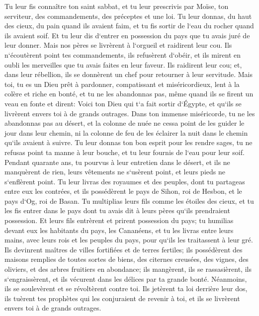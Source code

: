 \verse Tu leur fis connaître ton saint sabbat, et tu leur prescrivis par Moïse, ton serviteur, des commandements, des préceptes et une loi. 
\verse Tu leur donnas, du haut des cieux, du pain quand ils avaient faim, et tu fis sortir de l`eau du rocher quand ils avaient soif. Et tu leur dis d`entrer en possession du pays que tu avais juré de leur donner. 
\verse Mais nos pères se livrèrent à l`orgueil et raidirent leur cou. Ils n`écoutèrent point tes commandements, 
\verse ils refusèrent d`obéir, et ils mirent en oubli les merveilles que tu avais faites en leur faveur. Ils raidirent leur cou; et, dans leur rébellion, ils se donnèrent un chef pour retourner à leur servitude. Mais toi, tu es un Dieu prêt à pardonner, compatissant et miséricordieux, lent à la colère et riche en bonté, et tu ne les abandonnas pas, 
\verse même quand ils se firent un veau en fonte et dirent: Voici ton Dieu qui t`a fait sortir d`Égypte, et qu`ils se livrèrent envers toi à de grands outrages. 
\verse Dans ton immense miséricorde, tu ne les abandonnas pas au désert, et la colonne de nuée ne cessa point de les guider le jour dans leur chemin, ni la colonne de feu de les éclairer la nuit dans le chemin qu`ils avaient à suivre. 
\verse Tu leur donnas ton bon esprit pour les rendre sages, tu ne refusas point ta manne à leur bouche, et tu leur fournis de l`eau pour leur soif. 
\verse Pendant quarante ans, tu pourvus à leur entretien dans le désert, et ils ne manquèrent de rien, leurs vêtements ne s`usèrent point, et leurs pieds ne s`enflèrent point. 
\verse Tu leur livras des royaumes et des peuples, dont tu partageas entre eux les contrées, et ils possédèrent le pays de Sihon, roi de Hesbon, et le pays d`Og, roi de Basan. 
\verse Tu multiplias leurs fils comme les étoiles des cieux, et tu les fis entrer dans le pays dont tu avais dit à leurs pères qu`ils prendraient possession. 
\verse Et leurs fils entrèrent et prirent possession du pays; tu humilias devant eux les habitants du pays, les Cananéens, et tu les livras entre leurs mains, avec leurs rois et les peuples du pays, pour qu`ils les traitassent à leur gré. 
\verse Ils devinrent maîtres de villes fortifiées et de terres fertiles; ils possédèrent des maisons remplies de toutes sortes de biens, des citernes creusées, des vignes, des oliviers, et des arbres fruitiers en abondance; ils mangèrent, ils se rassasièrent, ils s`engraissèrent, et ils vécurent dans les délices par ta grande bonté. 
\verse Néanmoins, ils se soulevèrent et se révoltèrent contre toi. Ils jetèrent ta loi derrière leur dos, ils tuèrent tes prophètes qui les conjuraient de revenir à toi, et ils se livrèrent envers toi à de grands outrages. 
